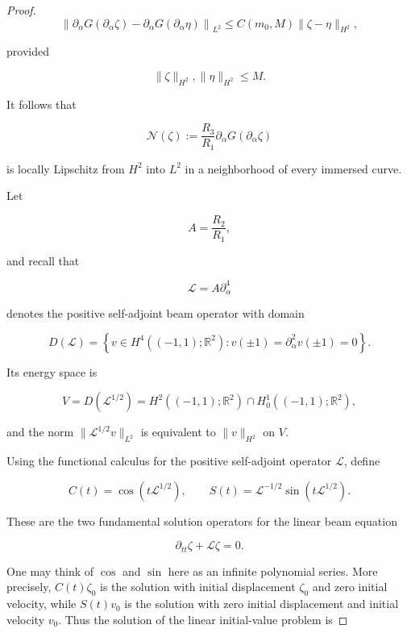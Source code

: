 \documentclass{article}[12pt]
\theoremstyle{Theorem}
\begin{document}
\begin{proof}
\begin{equation}
    \left\|
        \partial_\alpha G(\partial_\alpha\zeta)
        -
        \partial_\alpha G(\partial_\alpha\eta)
    \right\|_{L^2}
    \leq
    C(m_0,M)\|\zeta-\eta\|_{H^2},
    \label{lipschitz estimate}
\end{equation}

provided

$$
    \|\zeta\|_{H^2},\|\eta\|_{H^2}\leq M.
$$

It follows that

$$
    \mathcal N(\zeta)
    :=
    \frac{R_3}{R_1}
    \partial_\alpha G(\partial_\alpha\zeta)
$$

is locally Lipschitz from \(H^2\) into \(L^2\) in a neighborhood of every immersed curve.
\newline

Let

$$
    A=\frac{R_2}{R_1},
$$

and recall that

$$
    \mathcal L=A\partial_\alpha^4
$$

denotes the positive self-adjoint beam operator with domain

$$
    D(\mathcal L)
    =
    \left\{
        v\in H^4((-1,1);\mathbb R^2):
        v(\pm1)=\partial_\alpha^2v(\pm1)=0
    \right\}.
$$

Its energy space is

$$
    V=D(\mathcal L^{1/2})
      =H^2((-1,1);\mathbb R^2)\cap H_0^1((-1,1);\mathbb R^2),
$$

and the norm \(\|\mathcal L^{1/2}v\|_{L^2}\) is equivalent to \(\|v\|_{H^2}\) on \(V\).

Using the functional calculus for the positive self-adjoint operator \(\mathcal L\), define

$$
    C(t)=\cos(t\mathcal L^{1/2}),
    \qquad
    S(t)=\mathcal L^{-1/2}\sin(t\mathcal L^{1/2}).
$$

These are the two fundamental solution operators for the linear beam equation

$$
    \partial_{tt}\zeta+\mathcal L\zeta=0.
$$

One may think of $\cos$ and $\sin$ here as an infinite polynomial series. More precisely, \(C(t)\zeta_0\) is the solution with initial displacement \(\zeta_0\) and zero initial velocity, while \(S(t)v_0\) is the solution with zero initial displacement and initial velocity \(v_0\). Thus the solution of the linear initial-value problem is


\end{proof}
\end{document}
